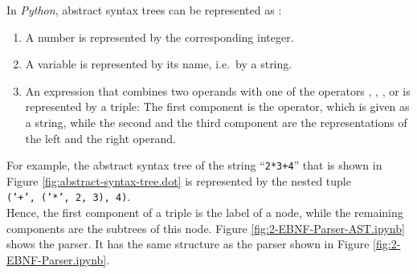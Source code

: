 In \textsl{Python}, abstract syntax trees can be represented as :
\begin{enumerate}
\item A number is represented by the corresponding integer.
\item A variable is represented by its name, i.e.~by a string.
\item An expression that combines two operands with one of the operators \squoted{+}, \squoted{-},
      \squoted{*}, or \squoted{/} is represented by a triple:  The first component is the operator, which is
      given as a string, while the second and the third component are the representations of the left and
      the right operand.
\end{enumerate}
For example, the abstract syntax tree of the string ``\texttt{2*3+4}'' that is shown in Figure
\ref{fig:abstract-syntax-tree.dot} is represented by the nested tuple
\\[0.2cm]
\hspace*{1.3cm}
\texttt{('+', ('*', 2, 3), 4)}.
\\[0.2cm]
Hence, the first component of a triple is the label of a node, while the remaining components are the
subtrees of this node.
Figure \ref{fig:2-EBNF-Parser-AST.ipynb} shows the parser.  It has the same structure as the parser shown
in Figure \ref{fig:2-EBNF-Parser.ipynb}.

